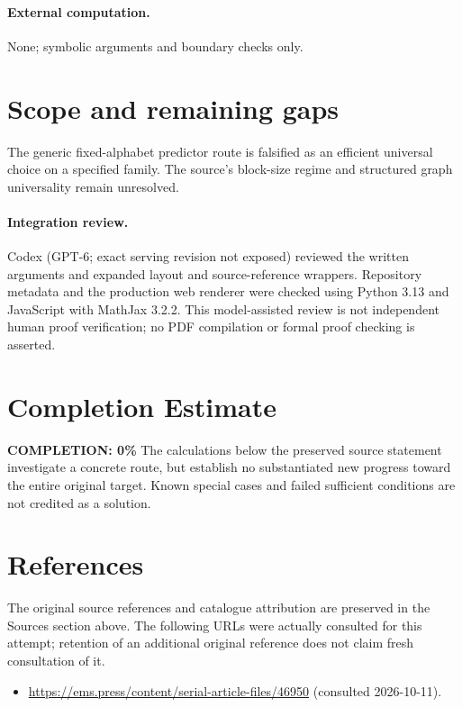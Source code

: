 \documentclass[11pt]{article}
\begin{document}
\paragraph{External computation.} None; symbolic arguments and boundary checks only.
\section{Scope and remaining gaps}
The generic fixed-alphabet predictor route is falsified as an efficient universal choice on a specified family. The source's block-size regime and structured graph universality remain unresolved.
\paragraph{Integration review.} Codex (GPT-6; exact serving revision not exposed) reviewed the written arguments and expanded layout and source-reference wrappers. Repository metadata and the production web renderer were checked using Python 3.13 and JavaScript with MathJax 3.2.2. This model-assisted review is not independent human proof verification; no PDF compilation or formal proof checking is asserted.

\section{Completion Estimate}
\noindent\textbf{COMPLETION: 0\%}
The calculations below the preserved source statement investigate a concrete route,
but establish no substantiated new progress toward the entire original target.
Known special cases and failed sufficient conditions are not credited as a solution.
\section{References}
The original source references and catalogue attribution are preserved in the
Sources section above. The following URLs were actually consulted for this attempt;
retention of an additional original reference does not claim fresh consultation of it.
\begin{itemize}
\item \url{https://ems.press/content/serial-article-files/46950} (consulted 2026-10-11). 
\end{itemize}
\end{document}
